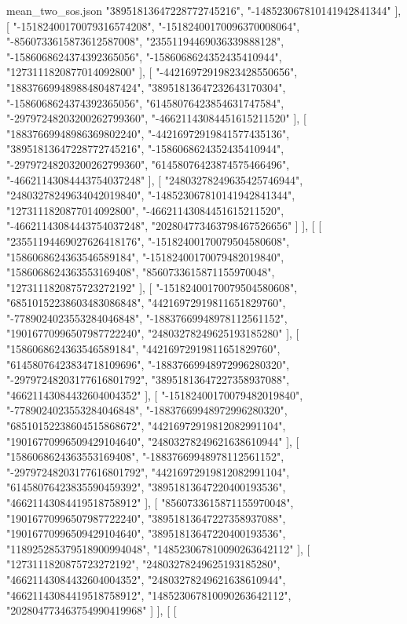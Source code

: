 \begin{filecontents*}[overwrite]{mean_two_sos.json}
    "38951813647228772745216",
    "-148523067810141942841344"
   ],
   [
    "-15182400170079316574208",
    "-15182400170096370008064",
    "-8560733615873612587008",
    "23551194469036339888128",
    "-1586068624374392365056",
    "-1586068624352435410944",
    "1273111820877014092800"
   ],
   [
    "-44216972919823428550656",
    "18837669948988480487424",
    "38951813647232643170304",
    "-1586068624374392365056",
    "61458076423854631747584",
    "-29797248203200262799360",
    "-46621143084451615211520"
   ],
   [
    "18837669948986369802240",
    "-44216972919841577435136",
    "38951813647228772745216",
    "-1586068624352435410944",
    "-29797248203200262799360",
    "61458076423874575466496",
    "-46621143084443754037248"
   ],
   [
    "24803278249635425746944",
    "24803278249634042019840",
    "-148523067810141942841344",
    "1273111820877014092800",
    "-46621143084451615211520",
    "-46621143084443754037248",
    "202804773463798467526656"
   ]
  ],
  [
   [
    "23551194469027626418176",
    "-15182400170079504580608",
    "1586068624363546589184",
    "-15182400170079482019840",
    "1586068624363553169408",
    "8560733615871155970048",
    "1273111820875723272192"
   ],
   [
    "-15182400170079504580608",
    "68510152238603483086848",
    "44216972919811651829760",
    "-7789024023553284046848",
    "-18837669948978112561152",
    "19016770996507987722240",
    "24803278249625193185280"
   ],
   [
    "1586068624363546589184",
    "44216972919811651829760",
    "61458076423834718109696",
    "-18837669948972996280320",
    "-29797248203177616801792",
    "38951813647227358937088",
    "46621143084432604004352"
   ],
   [
    "-15182400170079482019840",
    "-7789024023553284046848",
    "-18837669948972996280320",
    "68510152238604515868672",
    "44216972919812082991104",
    "19016770996509429104640",
    "24803278249621638610944"
   ],
   [
    "1586068624363553169408",
    "-18837669948978112561152",
    "-29797248203177616801792",
    "44216972919812082991104",
    "61458076423835590459392",
    "38951813647220400193536",
    "46621143084419518758912"
   ],
   [
    "8560733615871155970048",
    "19016770996507987722240",
    "38951813647227358937088",
    "19016770996509429104640",
    "38951813647220400193536",
    "118925285379518900994048",
    "148523067810090263642112"
   ],
   [
    "1273111820875723272192",
    "24803278249625193185280",
    "46621143084432604004352",
    "24803278249621638610944",
    "46621143084419518758912",
    "148523067810090263642112",
    "202804773463754990419968"
   ]
  ],
  [
   [

\end{filecontents*}
